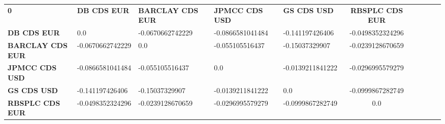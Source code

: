 \begin{center}
 \begin{tabular}{|l|l|l|l|l|c|c|c|c|c|}
\hline
\textbf{0} & \textbf{DB CDS EUR} & \textbf{BARCLAY CDS EUR} & \textbf{JPMCC CDS USD} & \textbf{GS CDS USD} & \textbf{RBSPLC CDS EUR}\\\hhline{|=|=|=|=|=|=|}
\textbf{DB CDS EUR} & 0.0 & -0.0670662742229 & -0.0866581041484 & -0.141197426406 & -0.0498352324296\\
\textbf{BARCLAY CDS EUR} & -0.0670662742229 & 0.0 & -0.055105516437 & -0.15037329907 & -0.0239128670659\\
\textbf{JPMCC CDS USD} & -0.0866581041484 & -0.055105516437 & 0.0 & -0.0139211841222 & -0.0296995579279\\
\textbf{GS CDS USD} & -0.141197426406 & -0.15037329907 & -0.0139211841222 & 0.0 & -0.0999867282749\\
\textbf{RBSPLC CDS EUR} & -0.0498352324296 & -0.0239128670659 & -0.0296995579279 & -0.0999867282749 & 0.0\\
\hline
\end{tabular}
\end{center}
